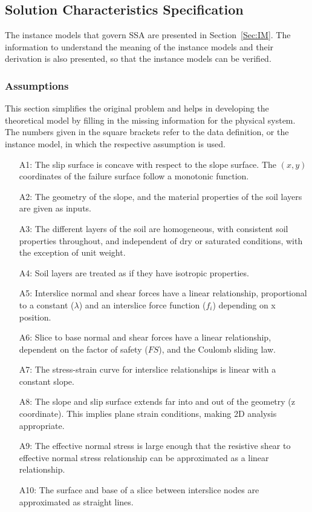 \documentclass[12pt]{article}
\begin{document}
\subsection{Solution Characteristics Specification}
\label{Sec:SCS}
The instance models that govern SSA are presented in Section~\ref{Sec:IM}. The information to understand the meaning of the instance models and their derivation is also presented, so that the instance models can be verified.
\subsubsection{Assumptions}
\label{Sec:A}
This section simplifies the original problem and helps in developing the theoretical model by filling in the missing information for the physical system. The numbers given in the square brackets refer to the data definition, or the instance model, in which the respective assumption is used.
\begin{itemize}
\item[A1:]The slip surface is concave with respect to the slope surface. The $(x,y)$ coordinates of the failure surface follow a monotonic function.
\item[A2:]The geometry of the slope, and the material properties of the soil layers are given as inputs.
\item[A3:]The different layers of the soil are homogeneous, with consistent soil properties throughout, and independent of dry or saturated conditions, with the exception of unit weight.
\item[A4:]Soil layers are treated as if they have isotropic properties.
\item[A5:]Interslice normal and shear forces have a linear relationship, proportional to a constant ($\lambda{}$) and an interslice force function ($f_{i}$) depending on x position.
\item[A6:]Slice to base normal and shear forces have a linear relationship, dependent on the factor of safety ($FS$), and the Coulomb sliding law.
\item[A7:]The stress-strain curve for interslice relationships is linear with a constant slope.
\item[A8:]The slope and slip surface extends far into and out of the geometry (z coordinate). This implies plane strain conditions, making 2D analysis appropriate.
\item[A9:]The effective normal stress is large enough that the resistive shear to effective normal stress relationship can be approximated as a linear relationship.
\item[A10:]The surface and base of a slice between interslice nodes are approximated as straight lines.
\end{itemize}
\end{document}
